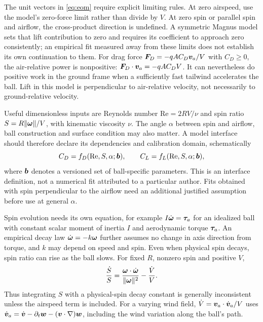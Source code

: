 The unit vectors in \cref{eq:eom} require explicit limiting rules.
At zero airspeed, use the model's zero-force limit rather than divide by $V$.
At zero spin or parallel spin and airflow, the cross-product direction is undefined.
A symmetric Magnus model sets that lift contribution to zero and requires its coefficient to approach zero consistently; an empirical fit measured away from these limits does not establish its own continuation to them.
For drag force $\bm{F}_D=-qAC_D\bm{v}_a/V$ with $C_D\geq0$, the air-relative power is nonpositive: $\bm{F}_D\cdot\bm{v}_a=-qAC_DV$.
It can nevertheless do positive work in the ground frame when a sufficiently fast tailwind accelerates the ball.
Lift in this model is perpendicular to air-relative velocity, not necessarily to ground-relative velocity.

Useful dimensionless inputs are Reynolds number $\mathrm{Re}=2RV/\nu$ and spin ratio $S=R\lVert\bm{\omega}\rVert/V$, with kinematic viscosity $\nu$.
The angle $\alpha$ between spin and airflow, ball construction and surface condition may also matter.
A model interface should therefore declare its dependencies and calibration domain, schematically
\begin{equation}
\label{eq:smits}
C_D=f_D(\mathrm{Re},S,\alpha;\bm{b}),\qquad
C_L=f_L(\mathrm{Re},S,\alpha;\bm{b}),
\end{equation}
where $\bm{b}$ denotes a versioned set of ball-specific parameters.
This is an interface definition, not a numerical fit attributed to a particular author.
Fits obtained with spin perpendicular to the airflow need an additional justified assumption before use at general $\alpha$.

Spin evolution needs its own equation, for example $I\dot{\bm{\omega}}=\bm{\tau}_{a}$ for an idealized ball with constant scalar moment of inertia $I$ and aerodynamic torque $\bm{\tau}_{a}$.
An empirical decay law $\dot{\bm{\omega}}=-k\bm{\omega}$ further assumes no change in axis direction from torque, and $k$ may depend on speed and spin.
Even when physical spin decays, spin ratio can rise as the ball slows.
For fixed $R$, nonzero spin and positive $V$,
\begin{equation}
\label{eq:spinratioevolution}
\frac{\dot S}{S}
=\frac{\bm{\omega}\cdot\dot{\bm{\omega}}}{\lVert\bm{\omega}\rVert^2}
-\frac{\dot V}{V}.
\end{equation}
Thus integrating $S$ with a physical-spin decay constant is generally inconsistent unless the airspeed term is included.
For a varying wind field, $\dot V=\bm{v}_a\cdot\dot{\bm{v}}_a/V$ uses $\dot{\bm{v}}_a=\dot{\bm{v}}-\partial_t\bm{w}-(\bm{v}\cdot\nabla)\bm{w}$, including the wind variation along the ball's path.

